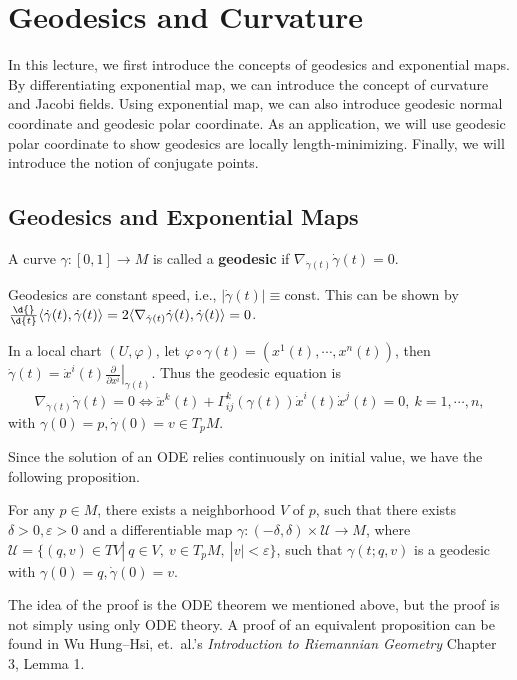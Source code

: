 \chapter{Geodesics and Curvature}
In this lecture, we first introduce the concepts of geodesics and exponential maps.
By differentiating exponential map, we can introduce the concept of curvature and Jacobi fields.
Using exponential map, we can also introduce geodesic normal coordinate and geodesic polar coordinate.
As an application, we will use geodesic polar coordinate to show geodesics are locally length-minimizing.
Finally, we will introduce the notion of conjugate points.

\section{Geodesics and Exponential Maps}
\begin{defn}
    A curve $\gamma:[0,1]\to M$ is called a \textbf{geodesic} if $\nabla_{\dot{\gamma}(t)}\dot{\gamma}(t)=0$.
\end{defn}

\begin{rem}
    Geodesics are constant speed, i.e., $|\dot{\gamma}(t)|\equiv\text{const}$.
    This can be shown by $\frac{\d{}}{\d{t}}\langle\dot{\gamma}(t),\dot{\gamma}(t)\rangle=2\langle\nabla_{\dot{\gamma}(t)}\dot{\gamma}(t),\dot{\gamma}(t)\rangle=0$.
\end{rem}

In a local chart $(U,\varphi)$, let $\varphi\circ\gamma(t)=(x^1(t),\cdots,x^n(t))$, then $\dot{\gamma}(t)=\dot{x}^i(t)\left.\frac{\partial{}}{\partial{x^i}}\right|_{\gamma(t)}$.
Thus the geodesic equation is
\[\nabla_{\dot{\gamma}(t)}\dot{\gamma}(t)=0\iff\ddot{x}^k(t)+\Gamma^k_{ij}(\gamma(t))\dot{x}^i(t)\dot{x}^j(t)=0,\ k=1,\cdots,n,\]
with $\gamma(0)=p,\dot{\gamma}(0)=v\in T_pM$.

Since the solution of an ODE relies continuously on initial value, we have the following proposition.
\begin{prop}\label{geodesic in nbhd}
    For any $p\in M$, there exists a neighborhood $V$ of $p$, such that there exists $\delta>0,\varepsilon>0$ and a differentiable map $\gamma:(-\delta,\delta)\times\mathscr{U}\to M$, where $\mathscr{U}=\{(q,v)\in TV|\ q\in V,\ v\in T_pM,\ |v|<\varepsilon\}$, such that $\gamma(t;q,v)$ is a geodesic with $\gamma(0)=q,\dot{\gamma}(0)=v$.
\end{prop}
The idea of the proof is the ODE theorem we mentioned above, but the proof is not simply using only ODE theory.
A proof of an equivalent proposition can be found in Wu Hung--Hsi, et.\ al.'s \emph{Introduction to Riemannian Geometry} Chapter 3, Lemma 1.

